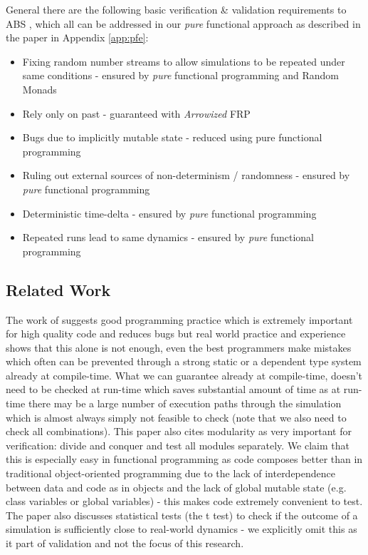 General there are the following basic verification \& validation requirements to ABS \cite{robinson_simulation:_2014}, which all can be addressed in our \textit{pure} functional approach as described in the paper in Appendix \ref{app:pfe}:

\begin{itemize}
	\item Fixing random number streams to allow simulations to be repeated under same conditions - ensured by \textit{pure} functional programming and Random Monads
	\item Rely only on past - guaranteed with \textit{Arrowized} FRP
	\item Bugs due to implicitly mutable state - reduced using pure functional programming
	\item Ruling out external sources of non-determinism / randomness - ensured by \textit{pure} functional programming
	\item Deterministic time-delta - ensured by \textit{pure} functional programming
	\item Repeated runs lead to same dynamics - ensured by \textit{pure} functional programming
\end{itemize}

\subsection{Related Work}
The work of \cite{kleijnen_verification_1995} suggests good programming practice which is extremely important for high quality code and reduces bugs but real world practice and experience shows that this alone is not enough, even the best programmers make mistakes which often can be prevented through a strong static or a dependent type system already at compile-time. What we can guarantee already at compile-time, doesn't need to be checked at run-time which saves substantial amount of time as at run-time there may be a large number of execution paths through the simulation which is almost always simply not feasible to check (note that we also need to check all combinations). This paper also cites modularity as very important for verification: divide and conquer and test all modules separately. We claim that this is especially easy in functional programming as code composes better than in traditional object-oriented programming due to the lack of interdependence between data and code as in objects and the lack of global mutable state (e.g. class variables or global variables) - this makes code extremely convenient to test. The paper also discusses statistical tests (the t test) to check if the outcome of a simulation is sufficiently close to real-world dynamics - we explicitly omit this as it part of validation and not the focus of this research. %

